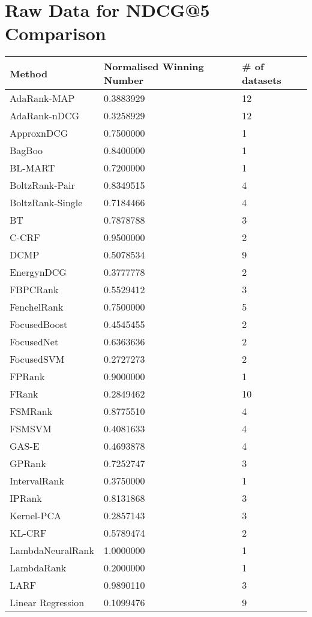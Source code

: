 \chapter{Raw Data for NDCG@5 Comparison}
\label{app:norm_winnum_ndcg5}

\begin{longtable}{l|l|l}
Method & Normalised Winning Number & \# of datasets \\
\hline
AdaRank-\acs{MAP} & 0.3883929 & 12 \\ 
AdaRank-\acs{nDCG} & 0.3258929 & 12 \\ 
Approx\acs{nDCG} & 0.7500000 & 1 \\ 
BagBoo & 0.8400000 & 1 \\ 
BL-MART & 0.7200000 & 1 \\ 
BoltzRank-Pair & 0.8349515 & 4 \\ 
BoltzRank-Single & 0.7184466 & 4 \\ 
BT & 0.7878788 & 3 \\ 
C-\acs{CRF} & 0.9500000 & 2 \\ 
DCMP & 0.5078534 & 9 \\ 
Energy\ac{nDCG} & 0.3777778 & 2 \\ 
FBPCRank & 0.5529412 & 3 \\ 
FenchelRank & 0.7500000 & 5 \\ 
FocusedBoost & 0.4545455 & 2 \\ 
FocusedNet & 0.6363636 & 2 \\ 
Focused\acs{SVM} & 0.2727273 & 2 \\ 
FPRank & 0.9000000 & 1 \\ 
FRank & 0.2849462 & 10 \\ 
FSMRank & 0.8775510 & 4 \\ 
FSM\acs{SVM} & 0.4081633 & 4 \\ 
GAS-E & 0.4693878 & 4 \\ 
\acs{GPRank} & 0.7252747 & 3 \\ 
IntervalRank & 0.3750000 & 1 \\ 
\acs{IP}Rank & 0.8131868 & 3 \\ 
Kernel-\acs{PCA} & 0.2857143 & 3 \\ 
KL-\acs{CRF} & 0.5789474 & 2 \\ 
LambdaNeuralRank & 1.0000000 & 1 \\ 
LambdaRank & 0.2000000 & 1 \\ 
LARF & 0.9890110 & 3 \\ 
Linear Regression & 0.1099476 & 9 \\ 

\end{longtable}
